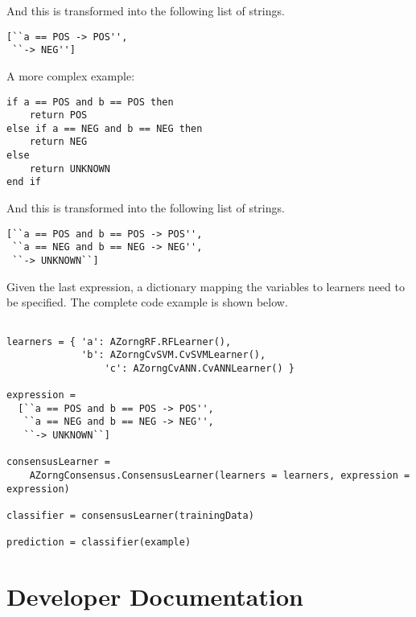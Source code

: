 \documentclass[12pt]{article}
\begin{document}
And this is transformed into the following list of strings.

\begin{verbatim}
[``a == POS -> POS'', 
 ``-> NEG'']
\end{verbatim}

A more complex example:

\begin{verbatim}
if a == POS and b == POS then
    return POS
else if a == NEG and b == NEG then
    return NEG
else
    return UNKNOWN
end if
\end{verbatim}

And this is transformed into the following list of strings.

\begin{verbatim}
[``a == POS and b == POS -> POS'', 
 ``a == NEG and b == NEG -> NEG'', 
 ``-> UNKNOWN``]
\end{verbatim}

\newpage
Given the last expression, a dictionary mapping the variables to learners need to
be specified. The complete code example is shown below.

\begin{verbatim}

learners = { 'a': AZorngRF.RFLearner(), 
             'b': AZorngCvSVM.CvSVMLearner(),
	             'c': AZorngCvANN.CvANNLearner() }

expression = 
  [``a == POS and b == POS -> POS'', 
   ``a == NEG and b == NEG -> NEG'', 
   ``-> UNKNOWN``]

consensusLearner = 
    AZorngConsensus.ConsensusLearner(learners = learners, expression = expression)

classifier = consensusLearner(trainingData)

prediction = classifier(example)
\end{verbatim}

\newpage
\section{Developer Documentation}\label{developer}
\end{document}

